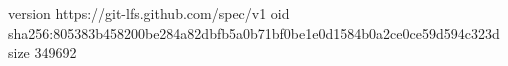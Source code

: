 version https://git-lfs.github.com/spec/v1
oid sha256:805383b458200be284a82dbfb5a0b71bf0be1e0d1584b0a2ce0ce59d594c323d
size 349692
